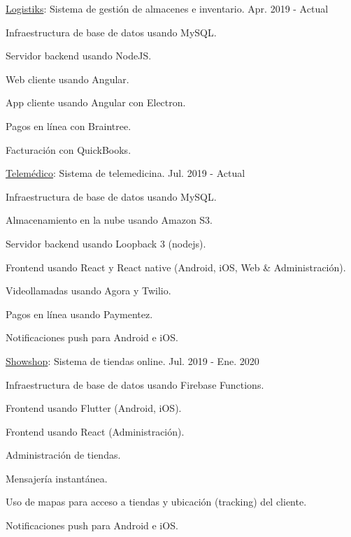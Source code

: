 \begin{cventries}
  \cventry
    {\href{https://logistiksusa.com/}{Logistiks}: Sistema de gestión de almacenes e inventario.} %
    {} %
    {} %
    {Apr. 2019 - Actual} %
    {
      \begin{cvitems} %
        \item {Infraestructura de base de datos usando MySQL.}
        \item {Servidor backend usando NodeJS.}
        \item {Web cliente usando Angular.}
        \item {App cliente usando Angular con Electron.}
        \item {Pagos en línea con Braintree.}
        \item {Facturación con QuickBooks.}
      \end{cvitems}
    }

  \cventry
    {\href{https://telemedico.com.ec/}{Telemédico}: Sistema de telemedicina.} %
    {} %
    {} %
    {Jul. 2019 - Actual} %
    {
      \begin{cvitems} %
        \item {Infraestructura de base de datos usando MySQL.}
        \item {Almacenamiento en la nube usando Amazon S3.}
        \item {Servidor backend usando Loopback 3 (nodejs).}
        \item {Frontend usando React y React native (Android, iOS, Web \& Administración).}
        \item {Videollamadas usando Agora y Twilio.}
        \item {Pagos en línea usando Paymentez.}
        \item {Notificaciones push para Android e iOS.}
      \end{cvitems}
    }

  \cventry
    {\href{https://showshop.app/}{Showshop}: Sistema de tiendas online.} %
    {} %
    {} %
    {Jul. 2019 - Ene. 2020} %
    {
      \begin{cvitems} %
        \item {Infraestructura de base de datos usando Firebase Functions.}
        \item {Frontend usando Flutter (Android, iOS).}
        \item {Frontend usando React (Administración).}
        \item {Administración de tiendas.}
        \item {Mensajería instantánea.}
        \item {Uso de mapas para acceso a tiendas y ubicación (tracking) del cliente.}
        \item {Notificaciones push para Android e iOS.}
      \end{cvitems}
    }


\end{cventries}

